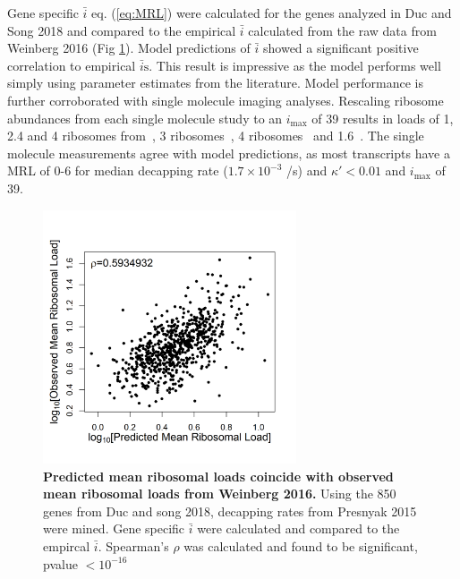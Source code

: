 \documentclass[10pt,letterpaper]{article}
\newcommand{\imax}{\ensuremath{{i_{\max}}}\xspace}
\newcommand{\MRL}{\ensuremath{\bar{i}}\xspace}
\newcommand{\MRLs}{\ensuremath{\bar{i}\text{s}}\xspace}
\begin{document}
Gene specific \MRL eq. (\ref{eq:MRL}) were calculated for the genes analyzed in Duc and Song 2018 and compared to the empirical \MRL calculated from the raw data from Weinberg 2016 (Fig \ref{fig11}).
Model predictions of \MRL showed a significant positive correlation to empirical \MRLs.
This result is impressive as the model performs well simply using parameter estimates from the literature.
Model performance is further corroborated with single molecule imaging analyses.
Rescaling ribosome abundances from each single molecule study to an \imax of 39 results in loads of 1, 2.4 and 4 ribosomes from~\cite{RN30}, 3 ribosomes~\cite{RN31}, 4 ribosomes~\cite{RN32} and 1.6~\cite{RN33}.
The single molecule measurements agree with model predictions, as most transcripts have a MRL of 0-6 for median decapping rate ($1.7\times 10^{-3}$ /s) and  $\kappa' < 0.01$ and \imax of 39.



\begin{figure}[!h]
  \begin{center}
    \centering
    \includegraphics[width=75mm]{Images/Duc_Song_vs_model_log.png}
    \caption{{\bf Predicted mean ribosomal loads coincide with observed mean ribosomal loads from Weinberg 2016.}
      Using the 850 genes from Duc and song 2018, decapping rates from Presnyak 2015 were mined.
      Gene specific \MRL were calculated and compared to the empircal \MRL.
      Spearman's $\rho$ was calculated and found to be significant, pvalue $<10^{-16}$}
    \label{fig11}
  \end{center}
\end{figure}
\end{document}
